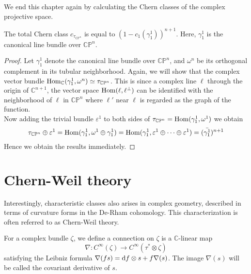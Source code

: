 	We end this chapter again by calculating the Chern classes of the complex projective space. 
	\begin{prop}
		The total Chern class $c_{\tau_{\mathbb{CP}^n}}$ is equal to $(1-c_1(\gamma_1^1))^{n+1}$. Here, $\gamma_1^1$ is the canonical line bundle over $\mathbb{CP}^n$. 
	\end{prop}
	\begin{proof}
		Let $\gamma_1^1$ denote the canonical line bundle over $\mathbb{CP}^n$, and $\omega^n$ be its orthogonal complement in its tubular neighborhood. Again, we will show that the complex vector bundle $\operatorname{\mathrm{Hom}}_{\mathbb{C}}(\gamma_1^1,\omega^n)\simeq\tau_{\mathbb{CP}^n}$. This is since a complex line $\ell$ through the origin of $\mathbb{C}^{n+1}$, the vector space $\operatorname{\mathrm{Hom}}(\ell,\ell^\bot)$ can be identified with the neighborhood of $\ell$ in $\mathbb{CP}^n$ where $\ell'$ near $\ell$ is regarded as the graph of the function. \\
		Now adding the trivial bundle $\varepsilon^1$ to both sides of $\tau_{\mathbb{CP}^n}=\operatorname{\mathrm{Hom}}(\gamma_1^1,\omega^1)$ we obtain 
		\[ \tau_{\mathbb{CP}^n}\oplus\varepsilon^1=\operatorname{\mathrm{Hom}}(\gamma_1^1,\omega^1\oplus\gamma_1^1)=\operatorname{\mathrm{Hom}}(\gamma_1^1,\varepsilon^1\oplus\cdots\oplus\varepsilon^1)=(\bar{\gamma_1^1})^{n+1} \]
		Hence we obtain the results immediately. 
	\end{proof}

\section{Chern-Weil theory}

	Interestingly, characteristic classes also arises in complex geometry, described in terms of curvature forms in the De-Rham cohomology. This characterization is often referred to as Chern-Weil theory. 

	\begin{defn}
		For a complex bundle $\zeta$, we define a connection on $\zeta$ is a $\mathbb{C}$-linear map 
		\[ \nabla:C^\infty(\zeta)\to C^\infty(\tau^*\otimes\zeta) \]
		satisfying the Leibniz formula $\nabla(fs)=\mathrm{d} f\otimes s+f\nabla(s)$. The image $\nabla(s)$ will be called the covariant derivative of $s$. 
	\end{defn}

